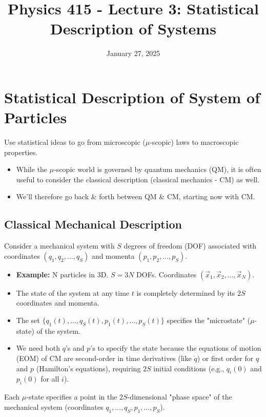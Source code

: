 \documentclass[11pt]{article}
\title{Physics 415 - Lecture 3: Statistical Description of Systems}
\date{January 27, 2025}
\author{} %
\begin{document}
\maketitle
\thispagestyle{empty}

\section*{Statistical Description of System of Particles}

Use statistical ideas to go from microscopic ($\mu$-scopic) laws to macroscopic properties.

\begin{itemize}
    \item While the $\mu$-scopic world is governed by quantum mechanics (QM), it is often useful to consider the classical description (classical mechanics - CM) as well.
    \item We'll therefore go back \& forth between QM \& CM, starting now with CM.
\end{itemize}

\subsection*{Classical Mechanical Description}

Consider a mechanical system with $S$ degrees of freedom (DOF) associated with coordinates $(q_1, q_2, \dots, q_S)$ and momenta $(p_1, p_2, \dots, p_S)$.
\begin{itemize}
    \item \textbf{Example:} N particles in 3D. $S=3N$ DOFs. Coordinates $(\vec{x}_1, \vec{x}_2, \dots, \vec{x}_N)$.
    \item The state of the system at any time $t$ is completely determined by its $2S$ coordinates and momenta.
    \item The set $\{q_1(t), \dots, q_S(t), p_1(t), \dots, p_S(t)\}$ specifies the "microstate" ($\mu$-state) of the system.
    \item We need both $q$'s and $p$'s to specify the state because the equations of motion (EOM) of CM are second-order in time derivatives (like $\ddot{q}$) or first order for $q$ and $p$ (Hamilton's equations), requiring $2S$ initial conditions (e.g., $q_i(0)$ and $p_i(0)$ for all $i$).
\end{itemize}
Each $\mu$-state specifies a point in the $2S$-dimensional "phase space" of the mechanical system (coordinates $q_1, \dots, q_S, p_1, \dots, p_S$).
\end{document}

